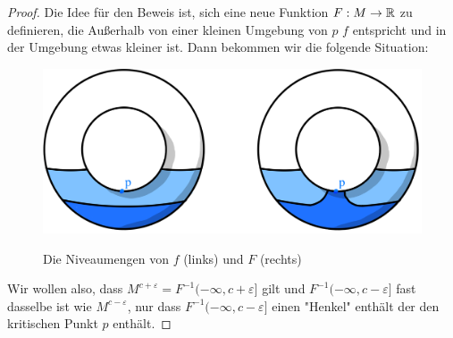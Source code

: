 \begin{proof}
    Die Idee für den Beweis ist, sich eine neue Funktion $F: M \to { \mathbb R }$ zu definieren,
    die Außerhalb von einer kleinen Umgebung von $p$ $f$ entspricht und in der 
    Umgebung etwas kleiner ist. Dann bekommen wir die folgende Situation:

    \begin{figure}[H]
        \centering
        \includegraphics[width=0.8\linewidth]{../resources/Me-Diagram5-sublevelsets-of-f-and-F.jpeg}
        \label{fig:me-diagram5}
        \caption{Die Niveaumengen von $f$ (links) und $F$ (rechts)}
    \end{figure}

    Wir wollen also, dass $M^{c + \varepsilon} = F^{-1}(- \infty, c + \varepsilon]$ 
    gilt und $F^{-1}(-\infty, c - \varepsilon]$ fast dasselbe ist wie 
    $M^{c - \varepsilon}$, nur dass $F^{-1}(-\infty, c - \varepsilon]$ einen "Henkel"
    enthält der den kritischen Punkt $p$ enthält.


\end{proof}
